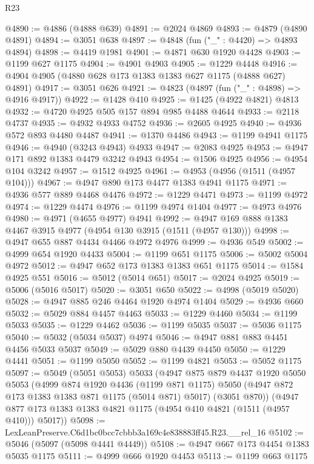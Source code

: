 \begin{lexlean}{R23}
\begin{coremodule}
@4890 := @4886 (@4888 @639)
@4891 := @2024 @4869
@4893 := @4879 (@4890 @4891)
@4894 := @3051 @638
@4897 := @4848 (fun ("_" : @4420) => @4893 @4894)
@4898 := @4419 @1981
@4901 := @4871 @630 @1920 @4428
@4903 := @1199 @627 @1175
@4904 := @4901 @4903
@4905 := @1229 @4448
@4916 := @4904 @4905 (@4880 @628 @173 @1383 @1383 @627 @1175 (@4888 @627) @4891)
@4917 := @3051 @626
@4921 := @4823 (@4897 (fun ("_" : @4898) => @4916 @4917))
@4922 := @1428 @410
@4925 := @1425 (@4922 @4821) @4813
@4932 := @4720 @4925 @505 @157 @894 @985 @4488 @4644
@4933 := @2118 @4737
@4935 := @4932 @4933 @4752
@4936 := @2605 @4925
@4940 := @4936 @572 @893 @4480 @4487
@4941 := @1370 @4486
@4943 := @1199 @4941 @1175
@4946 := @4940 (@3243 @4943) @4933
@4947 := @2083 @4925
@4953 := @4947 @171 @892 @1383 @4479 @3242 @4943
@4954 := @1506 @4925
@4956 := @4954 @104 @3242
@4957 := @1512 @4925
@4961 := @4953 (@4956 (@1511 (@4957 @104)))
@4967 := @4947 @890 @173 @4477 @1383 @4941 @1175
@4971 := @4936 @577 @889 @4468 @4476
@4972 := @1229 @4471
@4973 := @1199 @4972
@4974 := @1229 @4474
@4976 := @1199 @4974 @1404
@4977 := @4973 @4976
@4980 := @4971 (@4655 @4977) @4941
@4992 := @4947 @169 @888 @1383 @4467 @3915 @4977 (@4954 @130 @3915 (@1511 (@4957 @130)))
@4998 := @4947 @655 @887 @4434 @4466 @4972 @4976
@4999 := @4936 @549
@5002 := @4999 @654 @1920 @4433
@5004 := @1199 @651 @1175
@5006 := @5002 @5004 @4972
@5012 := @4947 @652 @173 @1383 @1383 @651 @1175
@5014 := @1584 @4925 @551
@5016 := @5012 (@5014 @651)
@5017 := @2024 @4925
@5019 := @5006 (@5016 @5017)
@5020 := @3051 @650
@5022 := @4998 (@5019 @5020)
@5028 := @4947 @885 @246 @4464 @1920 @4974 @1404
@5029 := @4936 @660
@5032 := @5029 @884 @4457 @4463
@5033 := @1229 @4460
@5034 := @1199 @5033
@5035 := @1229 @4462
@5036 := @1199 @5035
@5037 := @5036 @1175
@5040 := @5032 (@5034 @5037) @4974
@5046 := @4947 @881 @883 @4451 @4456 @5033 @5037
@5049 := @5029 @880 @4439 @4450
@5050 := @1229 @4441
@5051 := @1199 @5050
@5052 := @1199 @4821
@5053 := @5052 @1175
@5097 := @5049
    (@5051 @5053)
    @5033
    (@4947
      @875
      @879
      @4437
      @1920
      @5050
      @5053
      (@4999
        @874
        @1920
        @4436
        (@1199 @871 @1175)
        @5050
        (@4947 @872 @173 @1383 @1383 @871 @1175 (@5014 @871) @5017)
        (@3051 @870))
      (@4947 @877 @173 @1383 @1383 @4821 @1175 (@4954 @410 @4821 (@1511 (@4957 @410))) @5017))
@5098 := LexLeanPreserve.C6d1bc0bcc7cbbb3a169c4e838883ff45.R23.__rel_16
@5102 := @5046 (@5097 (@5098 @4441 @4449))
@5108 := @4947 @667 @173 @4454 @1383 @5035 @1175
@5111 := @4999 @666 @1920 @4453
@5113 := @1199 @663 @1175

\end{coremodule}
\end{lexlean}
